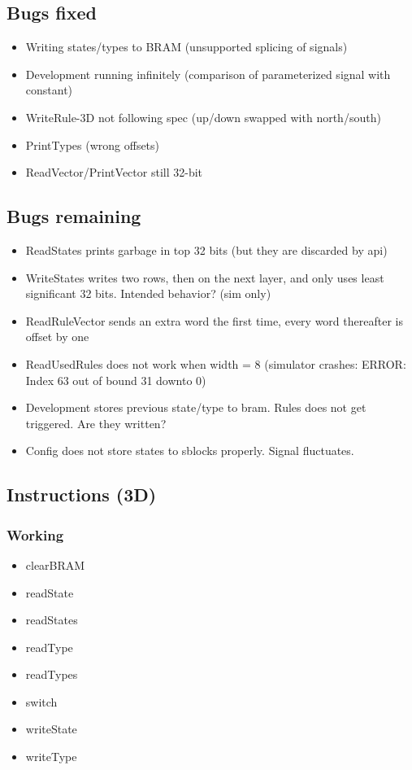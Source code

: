 \subsection{Bugs fixed}

\begin{itemize}
    \item Writing states/types to BRAM (unsupported splicing of signals)
    \item Development running infinitely (comparison of parameterized signal with constant)
    \item WriteRule-3D not following spec (up/down swapped with north/south)
    \item PrintTypes (wrong offsets)
    \item ReadVector/PrintVector still 32-bit
\end{itemize}

\subsection{Bugs remaining}

\begin{itemize}
    \item ReadStates prints garbage in top 32 bits (but they are discarded by api)
    \item WriteStates writes two rows, then on the next layer, and only uses least significant 32 bits. Intended behavior? (sim only)
    \item ReadRuleVector sends an extra word the first time, every word thereafter is offset by one
    \item ReadUsedRules does not work when width = 8 (simulator crashes: ERROR: Index 63 out of bound 31 downto 0)
    \item Development stores previous state/type to bram. Rules does not get triggered. Are they written?
    \item Config does not store states to sblocks properly. Signal fluctuates.
\end{itemize}

\subsection{Instructions (3D)}

\subsubsection{Working}

\begin{itemize}
    \item clearBRAM
    \item readState
    \item readStates
    \item readType
    \item readTypes
    \item switch
    \item writeState
    \item writeType
\end{itemize}

